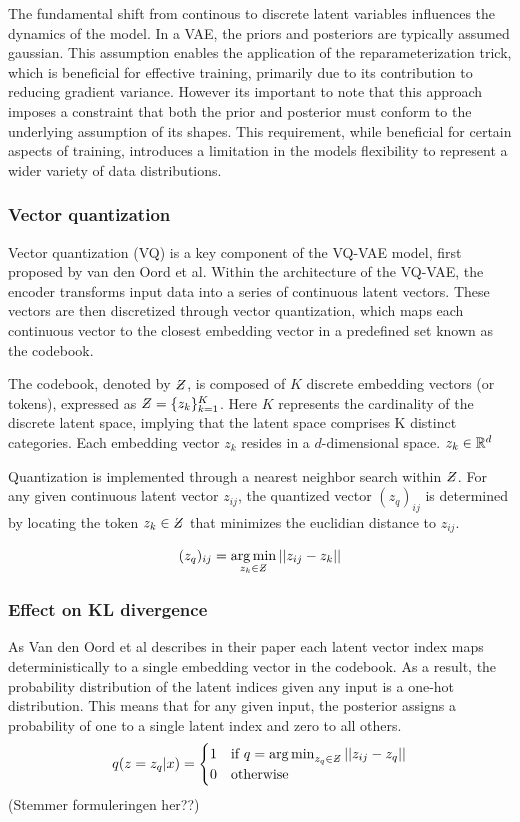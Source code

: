 The fundamental shift from continous to discrete latent variables influences the dynamics of the model. In a VAE, the priors and posteriors are typically assumed gaussian. This assumption enables the application of the reparameterization trick\cite{1312.6114}, which is beneficial for effective training, primarily due to its contribution to
reducing gradient variance. However its important to note that this approach imposes a constraint that both the prior and posterior must conform to the underlying assumption of its shapes. This requirement, while beneficial for certain aspects of training, introduces a limitation in the models flexibility to represent a wider variety of data distributions.


\subsubsection{Vector quantization}
Vector quantization (VQ) is a key component of the VQ-VAE model, first proposed by van den Oord et al\cite{neuvqvae}. Within the architecture of the VQ-VAE, the encoder transforms input data into a series of continuous latent vectors. These vectors are then discretized through vector quantization,
which maps each continuous vector to the closest embedding vector in a predefined set known as the codebook.

The codebook, denoted by $\Zstroke$, is composed of $K$ discrete embedding vectors (or tokens), expressed as $\Zstroke = \{z_k\}_{k=1}^K$. Here $K$ represents the cardinality of the discrete latent space,
implying that the latent space comprises K distinct categories. Each embedding vector $z_k$ resides in a $d$-dimensional space. $z_k \in \mathbb{R}^d$

Quantization is implemented through a nearest neighbor search within $\Zstroke$. For any given continuous latent vector $z_{ij}$, the quantized vector $(z_q)_{ij}$ is determined by locating the token $z_k \in \Zstroke$ that minimizes the euclidian distance to $z_{ij}$.

$$(z_q)_{ij} = \argmin_{z_k \in \Zstroke}|| z_{ij} - z_k ||$$

\subsubsection{Effect on KL divergence}
As Van den Oord et al describes in their paper \cite{neuvqvae} each latent vector index maps deterministically to a single embedding vector in the codebook. As a result, the probability distribution of the latent indices given any input is a one-hot distribution. 
This means that for any given input, the posterior assigns a probability of one to a single latent index and zero to all others. 
\begin{equation}
    q(z = z_q | x) =
    \begin{cases}
    1 & \text{if } q = \argmin_{z_q \in \Zstroke} || z_{ij} - z_q || \\
    0 & \text{otherwise}
    \end{cases}
\end{equation}
(Stemmer formuleringen her??)

